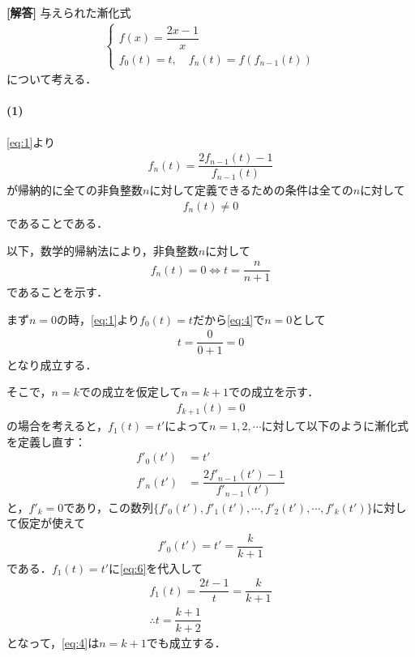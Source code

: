 \documentclass[../../main.tex]{subfiles}
\begin{document}
\begin{oframed}
  
\end{oframed}

{\bf [解答]}
与えられた漸化式
\begin{align}
  \begin{cases}
    f(x)=\dfrac{2x-1}{x} \\
    f_0(t)=t, \quad f_n(t)=f(f_{n-1}(t))
  \end{cases} \label{eq:1}
\end{align}
について考える．

\paragraph{(1)}

\cref{eq:1}より
\begin{align}
  f_{n}(t) = \dfrac{2f_{n-1}(t)-1}{f_{n-1}(t)} \label{eq:2}
\end{align}
が帰納的に全ての非負整数$n$に対して定義できるための条件は全ての$n$に対して
\begin{align}
  f_n(t) \neq 0 \label{eq:3}
\end{align}
であることである．

以下，数学的帰納法により，非負整数$n$に対して
\begin{align}
  f_n(t)=0 \iff t=\dfrac{n}{n+1} \label{eq:4}
\end{align}
であることを示す．

まず$n=0$の時，\cref{eq:1}より$f_0(t)=t$だから\cref{eq:4}で$n=0$として
\begin{align}
  t = \dfrac{0}{0+1} = 0
\end{align}
となり成立する．

そこで，$n=k$での成立を仮定して$n=k+1$での成立を示す．
\begin{align}
  f_{k+1}(t) = 0 \label{eq:5}
\end{align}
の場合を考えると，$f_{1}(t)=t'$によって$n=1,2,\cdots$に対して以下のように漸化式を定義し直す：
\begin{align}
  f'_{0}(t') &= t' \\
  f'_{n}(t') &= \dfrac{2f'_{n-1}(t')-1}{f'_{n-1}(t')}
\end{align}
と，$f'_{k}=0$であり，この数列$\{f'_{0}(t'),f'_{1}(t'),\cdots,f'_{2}(t'),\cdots,f'_{k}(t')\}$に対して仮定が使えて
\begin{align}
  f'_{0}(t') = t' = \dfrac{k}{k+1} \label{eq:6}
\end{align}
である．$f_{1}(t)=t'$に\cref{eq:6}を代入して
\begin{align}
  f_{1}(t) = \dfrac{2t-1}{t} = \dfrac{k}{k+1} \\
  \therefore
  t = \dfrac{k+1}{k+2}
\end{align}
となって，\cref{eq:4}は$n=k+1$でも成立する．
\end{document}

